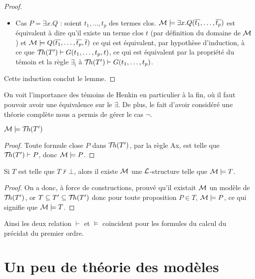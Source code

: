 \begin{proof}
\begin{itemize}[label=$\bullet$]
        \item Cas $P = \exists x. Q$ : soient $t_1,\ldots,t_p$ des termes clos. $\mathcal M\models \exists x. Q(\overline{t_1},\ldots,\overline{t_p})$ est équivalent à dire qu'il existe un terme clos $t$ (par définition du domaine de $\mathcal M$) et $\mathcal M\models Q(\overline{t_1},\ldots,\overline{t_p},\overline t)$ ce qui est équivalent, par hypothèse d'induction, à ce que $\mathcal{T}\!h(T')\vdash G(t_1,\ldots,t_p,t)$, ce qui est équivalent par la propriété du témoin et la règle $\exists_\mathrm i$ à $\mathcal{T}\!h(T')\vdash G(t_1,\ldots,t_p)$.
    \end{itemize}
    Cette induction conclut le lemme.
\end{proof}

\begin{rmk}
    On voit l'importance des témoins de Henkin en particulier à la fin, où il faut pouvoir avoir une équivalence sur le $\exists$. De plus, le fait d'avoir considéré une théorie complète nous a permis de gérer le cas $\lnot$.
\end{rmk}

\begin{prop}
    $\mathcal M\models \mathcal{T}\!h(T')$
\end{prop}

\begin{proof}
    Toute formule close $P$ dans $\mathcal{T}\!h(T')$, par la règle Ax, est telle que $\mathcal{T}\!h(T')\vdash P$, donc $\mathcal M\models P$.
\end{proof}

\begin{them}
    Si $T$ est telle que $T\nvdash \bot$, alors il existe $\mathcal M$ une $\mathcal L$-structure telle que $\mathcal M\models T$.
\end{them}

\begin{proof}
    On a donc, à force de constructions, prouvé qu'il existait $\mathcal M$ un modèle de $\mathcal{T}\!h(T')$, or $T\subseteq T'\subseteq \mathcal{T}\!h(T')$ donc pour toute proposition $P\in T$, $\mathcal M\models P$, ce qui signifie que $\mathcal M\models T$.
\end{proof}

\begin{them}
    Ainsi les deux relation $\vdash$ et $\vDash$ coïncident pour les formules du calcul du précidat du premier ordre.
\end{them}

\section{Un peu de théorie des modèles}

